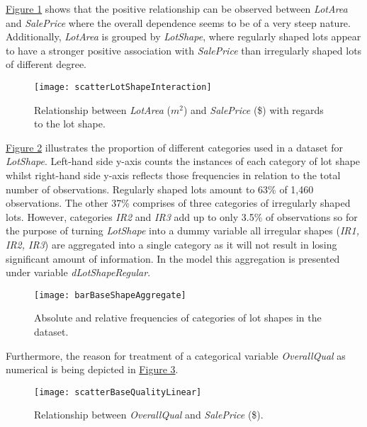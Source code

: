 \documentclass{article}
\begin{document}
\hyperref[fig:LotArea]{Figure 1} shows that the positive relationship can be observed between \emph{LotArea} and \emph{SalePrice} where the overall dependence seems to be of a very steep nature. Additionally, \emph{LotArea} is grouped by \emph{LotShape}, where regularly shaped lots appear to have a stronger positive association with \emph{SalePrice} than irregularly shaped lots of different degree.  

\begin{figure}[htp]
    \caption{Relationship between \emph{LotArea} ($m^{2}$) and \emph{SalePrice} (\$) with regards to the lot shape.}
    \centering
    \texttt{[image: scatterLotShapeInteraction]}
    \label{fig:LotArea}
\end{figure}

\hyperref[fig:dLotShapeRegular]{Figure 2} illustrates the proportion of different categories used in a dataset for \emph{LotShape}. Left-hand side y-axis counts the instances of each category of lot shape whilst right-hand side y-axis reflects those frequencies in relation to the total number of observations. Regularly shaped lots amount to 63\% of 1,460 observations. The other 37\% comprises of three categories of irregularly shaped lots. However, categories \emph{IR2} and \emph{IR3} add up to only 3.5\% of observations so for the purpose of turning \emph{LotShape} into a dummy variable all irregular shapes (\emph{IR1, IR2, IR3}) are aggregated into a single category as it will not result in losing significant amount of information. In the model this aggregation is presented under variable \emph{dLotShapeRegular}. 

\begin{figure}[htp]
    \caption{Absolute and relative frequencies of categories of lot shapes in the dataset.}
    \centering
    \texttt{[image: barBaseShapeAggregate]}
    \label{fig:dLotShapeRegular}
\end{figure}

Furthermore, the reason for treatment of a categorical variable \emph{OverallQual} as numerical is being depicted in \hyperref[fig:scatterBaseQualityLinear]{Figure 3}. 

\begin{figure}[htp]
    \caption{Relationship between \emph{OverallQual} and \emph{SalePrice} (\$).}
    \centering
    \texttt{[image: scatterBaseQualityLinear]}
    \label{fig:scatterBaseQualityLinear}
\end{figure}
\end{document}
